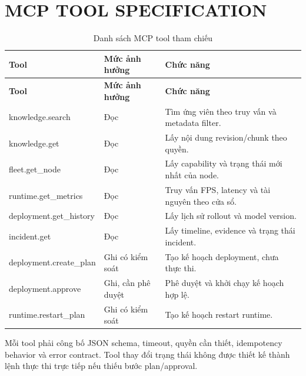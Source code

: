 \chapter{MCP TOOL SPECIFICATION}

\begin{longtable}{L{5cm}L{3cm}L{6.5cm}}
\caption{Danh sách MCP tool tham chiếu}\label{tab:mcp-tools}\\
\toprule
\textbf{Tool} & \textbf{Mức ảnh hưởng} & \textbf{Chức năng}\\
\midrule\endfirsthead
\toprule
\textbf{Tool} & \textbf{Mức ảnh hưởng} & \textbf{Chức năng}\\
\midrule\endhead
knowledge.search & Đọc & Tìm ứng viên theo truy vấn và metadata filter.\\
knowledge.get & Đọc & Lấy nội dung revision/chunk theo quyền.\\
fleet.get\_node & Đọc & Lấy capability và trạng thái mới nhất của node.\\
runtime.get\_metrics & Đọc & Truy vấn FPS, latency và tài nguyên theo cửa sổ.\\
deployment.get\_history & Đọc & Lấy lịch sử rollout và model version.\\
incident.get & Đọc & Lấy timeline, evidence và trạng thái incident.\\
deployment.create\_plan & Ghi có kiểm soát & Tạo kế hoạch deployment, chưa thực thi.\\
deployment.approve & Ghi, cần phê duyệt & Phê duyệt và khởi chạy kế hoạch hợp lệ.\\
runtime.restart\_plan & Ghi có kiểm soát & Tạo kế hoạch restart runtime.\\
\bottomrule
\end{longtable}

Mỗi tool phải công bố JSON schema, timeout, quyền cần thiết, idempotency behavior
và error contract. Tool thay đổi trạng thái không được thiết kế thành lệnh thực thi
trực tiếp nếu thiếu bước plan/approval.